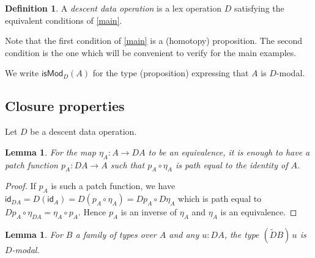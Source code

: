 \documentclass[10pt,a4paper,draft]{article}
\newcommand{\GG}{\mathsf{isMod}}
\newcommand{\id}{\mathsf{id}}
\newcommand{\D}{D}              %
\newcommand{\DD}{\tilde{D}} %
\renewcommand{\~}{\widetilde}
\newtheorem{lemma}[theorem]{Lemma}
\theoremstyle{definition}
\newtheorem{definition}[theorem]{Definition}
\theoremstyle{remark} %
\begin{document}
\begin{definition}
  A {\em descent data operation} is a lex operation $\D$
  satisfying the equivalent conditions of \cref{main}.
\end{definition}

Note that the first condition of \cref{main} is a (homotopy)
proposition. The second condition is the one which will be convenient to verify
for the main examples.



We write $\GG_\D(A)$ for the type (proposition) expressing that $A$ is $\D$\hyp{}modal.

\subsection{Closure properties}

 Let $\D$ be a descent data operation. %

\begin{lemma}\label{suff}
  For the map $\eta_A:A\rightarrow \D A$ to be an equivalence, it is enough to have
  a patch function $p_A:\D A\rightarrow A$ such that $p_A\circ\eta_A$ is path equal to the identity of $A$.
\end{lemma}

\begin{proof}
  If $p_A$ is such a patch function, we have
  $\id_{\D A} = \D(\id_A) = \D(p_A\circ\eta_A) = \D p_A\circ \D\eta_A$ which is path equal
  to $\D p_A\circ\eta_{\D A} = \eta_A\circ p_A$. Hence $p_A$ is an inverse of $\eta_A$ and $\eta_A$
  is an equivalence.
\end{proof}

\begin{lemma}\label{DD}
For $B$ a family of types over $A$ and any $u:\D A$, the type $(\DD B)\,u$ is $\D$\hyp{}modal.
\end{lemma}
\end{document}
